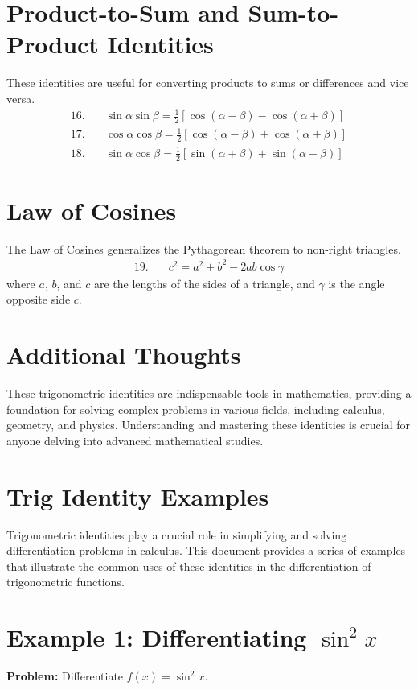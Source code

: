 \documentclass[a4paper,12pt]{book}
\newcounter{problem}
\newcounter{example}
\begin{document}
\section*{Product-to-Sum and Sum-to-Product Identities}
These identities are useful for converting products to sums or differences and vice versa.
\begin{align}
    16. \quad & \sin \alpha \sin \beta = \frac{1}{2}[\cos(\alpha - \beta) - \cos(\alpha + \beta)] \\
    17. \quad & \cos \alpha \cos \beta = \frac{1}{2}[\cos(\alpha - \beta) + \cos(\alpha + \beta)] \\
    18. \quad & \sin \alpha \cos \beta = \frac{1}{2}[\sin(\alpha + \beta) + \sin(\alpha - \beta)]
\end{align}

\section*{Law of Cosines}
The Law of Cosines generalizes the Pythagorean theorem to non-right triangles.
\begin{align}
    19. \quad & c^2 = a^2 + b^2 - 2ab \cos \gamma
\end{align}
where \( a \), \( b \), and \( c \) are the lengths of the sides of a triangle, and \( \gamma \) is the angle opposite side \( c \).

\section*{Additional Thoughts}
These trigonometric identities are indispensable tools in mathematics, providing a foundation for solving complex problems in various fields, including calculus, geometry, and physics. Understanding and mastering these identities is crucial for anyone delving into advanced mathematical studies.


\section*{Trig Identity Examples}
Trigonometric identities play a crucial role in simplifying and solving differentiation problems in calculus. This document provides a series of examples that illustrate the common uses of these identities in the differentiation of trigonometric functions.

\section*{Example 1: Differentiating $\sin^2 x$}
\textbf{Problem:} Differentiate $f(x) = \sin^2 x$.
\end{document}
